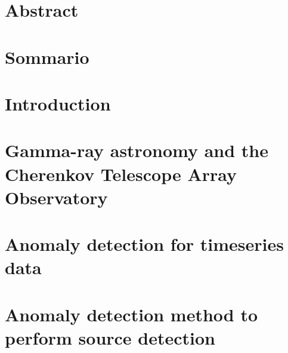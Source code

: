 \documentclass[oneside,openright,titlepage,numbers=noenddot,headinclude,footinclude=true,cleardoublepage=empty,listof=totoc,paper=a4,fontsize=11pt,american,BCOR=5mm]{scrreprt}
\begin{document}
  \frenchspacing
  \raggedbottom
  
  \pagestyle{plain}
  
  \singlespacing
  
  
  
  \onehalfspacing
  
  
  \chapter*{Abstract}
  
  \newpage

  \chapter*{Sommario}
  
  \newpage

  
  
  \newpage

  
  
  \newpage

  \cleardoublepage
  \pagestyle{scrheadings}
  \onehalfspacing
  
  \chapter{Introduction}\label{c:Introduction}
   
  \newpage

  \chapter{Gamma-ray astronomy and the Cherenkov Telescope Array Observatory}\label{c:Background-Gamma-Ray-Astronomy}
  
  \newpage
 
  \chapter{Anomaly detection for timeseries data}\label{c:Background-Anomaly-Detection}
  
  \newpage
   
  \chapter{Anomaly detection method to perform source detection}\label{c:Contribution}
   
  \newpage
\end{document}
